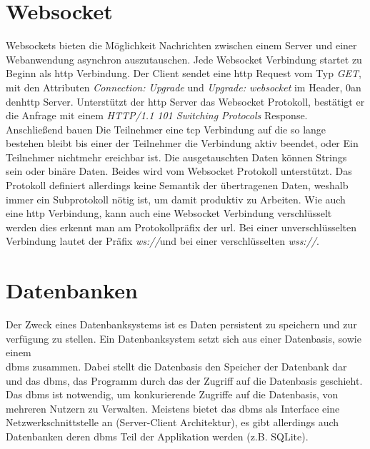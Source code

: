 \section{Websocket}
Websockets bieten die Möglichkeit Nachrichten zwischen einem Server und einer Webanwendung asynchron auszutauschen.
Jede Websocket Verbindung startet zu Beginn als \ac{http} Verbindung. 
Der Client sendet eine \ac{http} Request vom Typ \emph{GET},
mit den Attributen \emph{Connection: Upgrade} und \emph{Upgrade: websocket} im Header, 0an den\ac{http} Server.
Unterstützt der \ac{http} Server das Websocket Protokoll, 
bestätigt er die Anfrage mit einem \emph{HTTP/1.1 101 Switching Protocols} Response.
Anschließend bauen Die Teilnehmer eine \ac{tcp} Verbindung auf die so lange bestehen bleibt bis einer der Teilnehmer die Verbindung aktiv beendet, 
oder Ein Teilnehmer nichtmehr ereichbar ist.
Die ausgetauschten Daten können Strings sein oder binäre Daten. Beides wird vom Websocket Protokoll unterstützt.
Das Protokoll definiert allerdings keine Semantik der übertragenen Daten, 
weshalb immer ein Subprotokoll nötig ist, um damit produktiv zu Arbeiten.
Wie auch eine \ac{http} Verbindung, kann auch eine Websocket Verbindung verschlüsselt werden dies erkennt man am Protokollpräfix der \ac{url}.
Bei einer unverschlüsselten Verbindung lautet der Präfix \glqq \emph{ws://}\grqq{}und bei einer verschlüsselten \glqq \emph{wss://}\grqq.

\section{Datenbanken}
Der Zweck eines Datenbanksystems ist es Daten persistent zu speichern und zur verfügung zu stellen.
Ein Datenbanksystem setzt sich aus einer Datenbasis, sowie einem\\ \ac{dbms} zusammen.
Dabei stellt die Datenbasis den Speicher der Datenbank dar und das \ac{dbms}, 
das Programm durch das der Zugriff auf die Datenbasis geschieht.
Das \ac{dbms} ist notwendig, um konkurierende Zugriffe auf die Datenbasis, von mehreren Nutzern zu Verwalten. \citep{Schubert:2007:3}
Meistens bietet das \ac{dbms} als Interface eine Netzwerkschnittstelle an (Server-Client Architektur), es gibt allerdings auch Datenbanken deren \ac{dbms} Teil der Applikation werden (z.B. SQLite).
